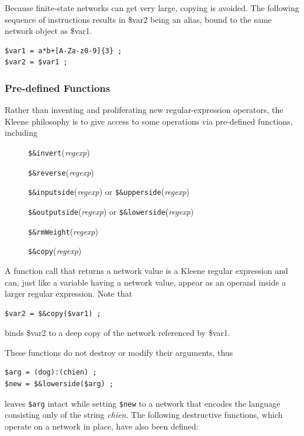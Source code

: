 \documentclass[letterpaper,12pt]{article}
\newcommand{\Kleene}{Kleene\xspace}
\begin{document}
Because finite-state networks can get very large, copying is avoided.
The following sequence of instructions results in \$var2 being an alias, bound to
the same network object as \$var1.

\begin{Verbatim}[fontsize=\small]
$var1 = a*b+[A-Za-z0-9]{3} ;
$var2 = $var1 ;
\end{Verbatim}

\subsubsection{Pre-defined Functions}

Rather than inventing and proliferating new regular-expression operators, 
the \Kleene{} philosophy is to give access to some operations via
pre-defined functions, including

\begin{description}
\item[]
\verb!$&invert!(\textit{regexp})
\item[]
\verb!$&reverse!(\textit{regexp})
\item[]
\verb!$&inputside!(\textit{regexp}) or \verb!$&upperside!(\textit{regexp}) 
\item[]
\verb!$&outputside!(\textit{regexp}) or \verb!$&lowerside!(\textit{regexp}) 
\item[]
\verb!$&rmWeight!(\textit{regexp})
\item[]
\verb!$&copy!(\textit{regexp}) 
\end{description}

\noindent
A function call that returns a network value is a \Kleene{} regular
expression and can, just like a variable having a network value,
appear as an operand inside a larger regular expression.  Note that

\begin{Verbatim}[fontsize=\small]
$var2 = $&copy($var1) ;
\end{Verbatim}

\noindent
binds \$var2 to a deep copy of the network referenced by \$var1.

These functions do not destroy or modify their arguments, thus

\begin{Verbatim}[fontsize=\small]
$arg = (dog):(chien) ;
$new = $&lowerside($arg) ;
\end{Verbatim}

\noindent
leaves \verb!$arg! intact while setting \verb!$new! to a network
that encodes the language consisting only of the string
\emph{chien}.  The following destructive functions, which operate on
a network in place, have also been
defined:
\end{document}
